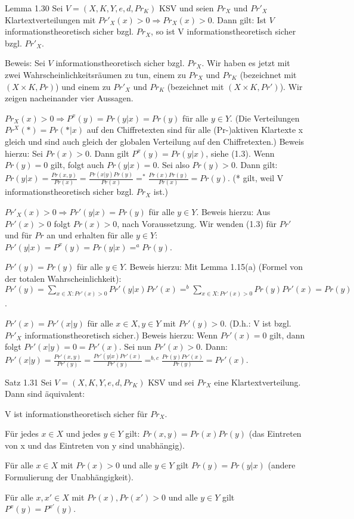 \documentclass[a4paper]{article}
\begin{document}
\begin{multicols}{3}
    Lemma 1.30 Sei $V=(X,K,Y,e,d,Pr_K)$ KSV und seien $Pr_X$ und $Pr'_X$ Klartextverteilungen mit $Pr'_X(x)>0\Rightarrow Pr_X(x)>0$. Dann gilt: Ist $V$ informationstheoretisch sicher bzgl. $Pr_X$, so ist V informationstheoretisch sicher bzgl. $Pr'_X$.

    Beweis: Sei $V$ informationstheoretisch sicher bzgl. $Pr_X$. Wir haben es jetzt mit zwei Wahrscheinlichkeitsräumen zu tun, einem zu $Pr_X$ und $Pr_K$ (bezeichnet mit $(X\times K,Pr)$) und einem zu $Pr'_X$ und $Pr_K$ (bezeichnet mit $(X\times K,Pr')$).
    Wir zeigen nacheinander vier Aussagen.
    \begin{enumerate*}
        \item $Pr_X(x)> 0 \Rightarrow P^x(y) = Pr(y|x) = Pr(y)$ für alle $y\in Y$. (Die Verteilungen $Pr^X(*)=Pr(*|x)$ auf den Chiffretexten sind für alle (Pr-)aktiven Klartexte x gleich und sind auch gleich der globalen Verteilung auf den Chiffretexten.) Beweis hierzu: Sei $Pr(x)>0$. Dann gilt $P^x(y)=Pr(y|x)$, siehe (1.3). Wenn $Pr(y)=0$ gilt, folgt auch $Pr(y|x)=0$. Sei also $Pr(y)>0$. Dann gilt: $Pr(y|x) =\frac{Pr(x,y)}{Pr(x)}=\frac{Pr(x|y)Pr(y)}{Pr(x)}=^* \frac{Pr(x)Pr(y)}{Pr(x)}= Pr(y)$. (* gilt, weil V informationstheoretisch sicher bzgl. $Pr_X$ ist.)
        \item $Pr'_X(x)> 0 \Rightarrow Pr'(y|x) = Pr(y)$ für alle $y\in Y$. Beweis hierzu: Aus $Pr'(x)>0$ folgt $Pr(x)>0$, nach Voraussetzung. Wir wenden (1.3) für $Pr'$ und für $Pr$ an und erhalten für alle $y\in Y$: $Pr'(y|x)=P^x(y)=Pr(y|x)=^a Pr(y)$.
        \item $Pr'(y)=Pr(y)$ für alle $y\in Y$. Beweis hierzu: Mit Lemma 1.15(a) (Formel von der totalen Wahrscheinlichkeit): $Pr'(y)=\sum_{x\in X: Pr'(x)> 0} Pr'(y|x)Pr'(x)=^b \sum_{x\in X: Pr'(x)> 0} Pr(y)Pr'(x) = Pr(y)$.
        \item $Pr'(x)=Pr'(x|y)$ für alle $x\in X,y\in Y$ mit $Pr'(y)>0$. (D.h.: V ist bzgl. $Pr'_X$ informationstheoretisch sicher.) Beweis hierzu: Wenn $Pr'(x)=0$ gilt, dann folgt $Pr'(x|y)=0=Pr'(x)$. Sei nun $Pr'(x)>0$. Dann: $Pr'(x|y)=\frac{Pr'(x,y)}{Pr'(y)}=\frac{Pr'(y|x)Pr'(x)}{Pr'(y)}=^{b,c} \frac{Pr(y)Pr'(x)}{Pr(y)} = Pr'(x)$.
    \end{enumerate*}

    Satz 1.31 Sei $V=(X,K,Y,e,d,Pr_K)$ KSV und sei $Pr_X$ eine Klartextverteilung. Dann sind äquivalent:
    \begin{enumerate*}
        \item V ist informationstheoretisch sicher für $Pr_X$.
        \item Für jedes $x\in X$ und jedes $y\in Y$ gilt: $Pr(x,y)=Pr(x)Pr(y)$ (das Eintreten von x und das Eintreten von y sind unabhängig).
        \item Für alle $x\in X$ mit $Pr(x)>0$ und alle $y\in Y$ gilt $Pr(y)=Pr(y|x)$ (andere Formulierung der Unabhängigkeit).
        \item Für alle $x,x'\in X$ mit $Pr(x),Pr(x')>0$ und alle $y\in Y$ gilt $P^x(y)=P^{x'}(y)$.
    \end{enumerate*}


\end{multicols}
\end{document}
